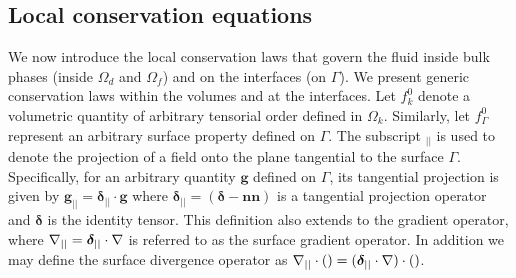 \subsection{Local conservation equations}
\label{sec:local_eq}
We now introduce the local conservation laws that govern the fluid inside bulk phases (inside $\Omega_d$ and $\Omega_f$) and on the interfaces (on $\Gamma$). 
We present generic conservation laws within the volumes and at the interfaces. 
Let $f_k^0$ denote a volumetric quantity of arbitrary tensorial order defined in $\Omega_k$.
Similarly, let $f_\Gamma^0$ represent an arbitrary surface property defined on $\Gamma$. The subscript $_{||}$ is used to denote the projection of a field onto the plane tangential to the surface $\Gamma$. Specifically, for an arbitrary quantity $\textbf{g}$ defined on $\Gamma$, its tangential projection is given by $\textbf{g}_{||} = \bm\delta_{||}\cdot \textbf{g}$ where $\bm\delta_{||} = (\bm\delta-\textbf{nn})$ is a tangential projection operator and $\bm\delta$ is the identity tensor. This definition also extends to the gradient operator, where $\mathbf{\nabla}_{||}= \bm\delta _{||}\cdot \mathbf{\nabla}$ is referred to as the surface gradient operator. In addition we may define the surface divergence operator as $\mathbf{\nabla}_{||} \cdot ()= (\bm\delta _{||}\cdot \mathbf{\nabla})\cdot()$.


